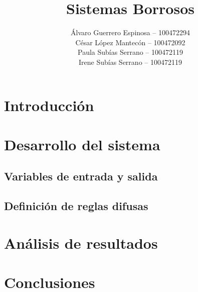 \documentclass[es]{uc3mreport}
\author{
    Álvaro Guerrero Espinosa -- 100472294\\
    César López Mantecón -- 100472092\\
    Paula Subías Serrano -- 100472119\\
    Irene Subías Serrano -- 100472119
}
\title{Sistemas Borrosos}
\begin{document}
  \makecover[new]

  \tableofcontents
\listoffigures
\listoftables

\begin{report}
    \section{Introducción}
    \label{chap:intro}

    \section{Desarrollo del sistema}
    \label{chap:intro}

    \subsection{Variables de entrada y salida}
    \subsection{Definición de reglas difusas}

    \section{Análisis de resultados}
    \label{chap:resultados}

    \section{Conclusiones}
    \label{chap:conclusion}

\end{report}

{}
\label{bibliography}
\printbibliography[title={Bibliografía}]  %
\end{document}
